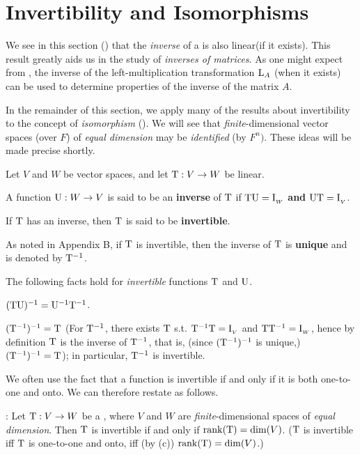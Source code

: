 \section{Invertibility and Isomorphisms} \label{sec 2.4}

We see in this section () that the \emph{inverse} of a \LTRAN{} is also linear(if it exists).
This result greatly aids us in the study of \emph{inverses of matrices}.
As one might expect from , the inverse of the left-multiplication transformation \(\mathrm{L}_A\) (when it exists) can be used to determine properties of the inverse of the matrix \(A\).

In the remainder of this section, we apply many of the results about invertibility to the concept of \emph{isomorphism} ().
We will see that \emph{finite}-dimensional vector spaces (over \(F\)) of \emph{equal dimension} may be \emph{identified} (by \(F^n)\).
These ideas will be made precise shortly.

\begin{definition} \label{def 2.12}
Let \(V\) and \(W\) be vector spaces, and let \(\mathrm{T} : V \to W\) be linear.

 A function \(\mathrm{U}: W \to V\) is said to be an \textbf{inverse} of \(\mathrm{T}\) if \(\mathrm{T}\mathrm{U} = \mathrm{I}_{_W}\) \textbf{and} \(\mathrm{U}\mathrm{T} = \mathrm{I}_{_V}\).

 If \(\mathrm{T}\) has an inverse, then \(\mathrm{T}\) is said to be \textbf{invertible}.

 As noted in Appendix B, if \(\mathrm{T}\) is invertible, then the inverse of \(\mathrm{T}\) is \textbf{unique} and is denoted by \(\mathrm{T}^{-1}\).
\end{definition}

\begin{additional theorem} \label{athm 2.35}
The following facts hold for \emph{invertible} functions \(\mathrm{T}\) and \(\mathrm{U}\).

 \((\mathrm{T}\mathrm{U})^{-1} = \mathrm{U}^{-1} \mathrm{T}^{-1}\).

 \((\mathrm{T}^{-1})^{-1} = \mathrm{T}\)
(For \(\mathrm{T}^{-1}\), there exists \(\mathrm{T}\) s.t. \(\mathrm{T}^{-1}\mathrm{T} = \mathrm{I}_{_V}\) and \(\mathrm{T}\mathrm{T}^{-1} = \mathrm{I}_{_W}\),
hence by definition \(\mathrm{T}\) is the inverse of \(\mathrm{T}^{-1}\), that is, (since \((\mathrm{T}^{-1})^{-1}\) is unique,) \((\mathrm{T}^{-1})^{-1} = \mathrm{T}\));
in particular, \(\mathrm{T}^{-1}\) is invertible.

We often use the fact that a function is invertible if and only if it is both one-to-one and onto.
We can therefore restate  as follows.

: Let \(\mathrm{T} : V \to W\) be a \LTRAN{}, where \(V\) and \(W\) are \emph{finite}-dimensional spaces of \emph{equal dimension}.
Then \(\mathrm{T}\) is invertible if and only if \(\mathrm{rank}(\mathrm{T}) = \dim(V)\).
(\(\mathrm{T}\) is invertible iff \(\mathrm{T}\) is one-to-one and onto, iff (by (c)) \(\mathrm{rank}(\mathrm{T}) = \dim(V)\).)
\end{additional theorem}


